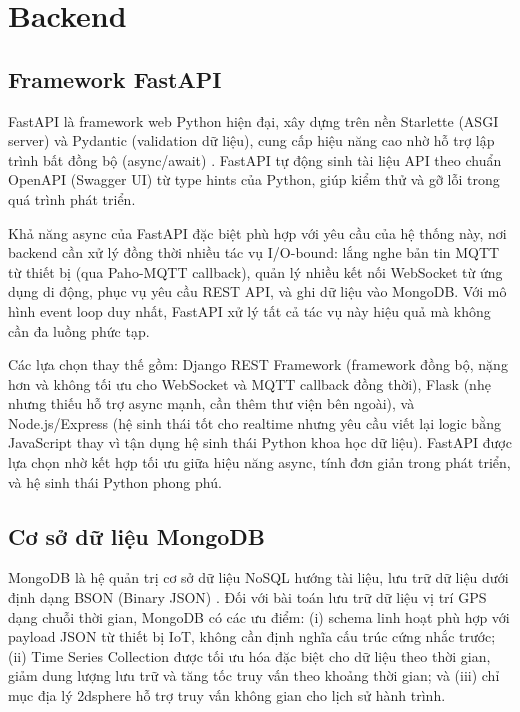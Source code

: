 \documentclass[../DoAn.tex]{subfiles}
\begin{document}
\section{Backend}
\label{section:3.3}

\subsection{Framework FastAPI}
\label{subsection:3.3.1}

FastAPI là framework web Python hiện đại, xây dựng trên nền Starlette (ASGI server) và Pydantic (validation dữ liệu), cung cấp hiệu năng cao nhờ hỗ trợ lập trình bất đồng bộ (async/await) \cite{fastapi_docs}. FastAPI tự động sinh tài liệu API theo chuẩn OpenAPI (Swagger UI) từ type hints của Python, giúp kiểm thử và gỡ lỗi trong quá trình phát triển.

Khả năng async của FastAPI đặc biệt phù hợp với yêu cầu của hệ thống này, nơi backend cần xử lý đồng thời nhiều tác vụ I/O-bound: lắng nghe bản tin MQTT từ thiết bị (qua Paho-MQTT callback), quản lý nhiều kết nối WebSocket từ ứng dụng di động, phục vụ yêu cầu REST API, và ghi dữ liệu vào MongoDB. Với mô hình event loop duy nhất, FastAPI xử lý tất cả tác vụ này hiệu quả mà không cần đa luồng phức tạp.

Các lựa chọn thay thế gồm: Django REST Framework (framework đồng bộ, nặng hơn và không tối ưu cho WebSocket và MQTT callback đồng thời), Flask (nhẹ nhưng thiếu hỗ trợ async mạnh, cần thêm thư viện bên ngoài), và Node.js/Express (hệ sinh thái tốt cho realtime nhưng yêu cầu viết lại logic bằng JavaScript thay vì tận dụng hệ sinh thái Python khoa học dữ liệu). FastAPI được lựa chọn nhờ kết hợp tối ưu giữa hiệu năng async, tính đơn giản trong phát triển, và hệ sinh thái Python phong phú.

\subsection{Cơ sở dữ liệu MongoDB}
\label{subsection:3.3.2}

MongoDB là hệ quản trị cơ sở dữ liệu NoSQL hướng tài liệu, lưu trữ dữ liệu dưới định dạng BSON (Binary JSON) \cite{mongodb_docs}. Đối với bài toán lưu trữ dữ liệu vị trí GPS dạng chuỗi thời gian, MongoDB có các ưu điểm: (i) schema linh hoạt phù hợp với payload JSON từ thiết bị IoT, không cần định nghĩa cấu trúc cứng nhắc trước; (ii) Time Series Collection được tối ưu hóa đặc biệt cho dữ liệu theo thời gian, giảm dung lượng lưu trữ và tăng tốc truy vấn theo khoảng thời gian; và (iii) chỉ mục địa lý 2dsphere hỗ trợ truy vấn không gian cho lịch sử hành trình.
\end{document}
